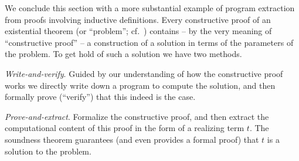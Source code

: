 \documentclass[12pt]{amsart}
\newcommand{\inquotes}[1]{``#1''}
\begin{document}





We conclude this section with a more substantial example of program
extraction from proofs involving inductive definitions.  Every
constructive proof of an existential theorem (or \inquotes{problem};
cf.\ \cite{Kolmogorov32}) contains -- by the very meaning of
\inquotes{constructive proof} -- a construction of a solution in terms
of the parameters of the problem.  To get hold of such a solution we
have two methods.

\emph{Write-and-verify}.  Guided by our understanding of how the
constructive proof works we directly write down a program to compute
the solution, and then formally prove (\inquotes{verify}) that this
indeed is the case.

\emph{Prove-and-extract}.  Formalize the constructive proof, and then
extract the computational content of this proof in the form of a
realizing term $t$.  The soundness theorem guarantees (and even
provides a formal proof) that $t$ is a solution to the problem.
\end{document}
